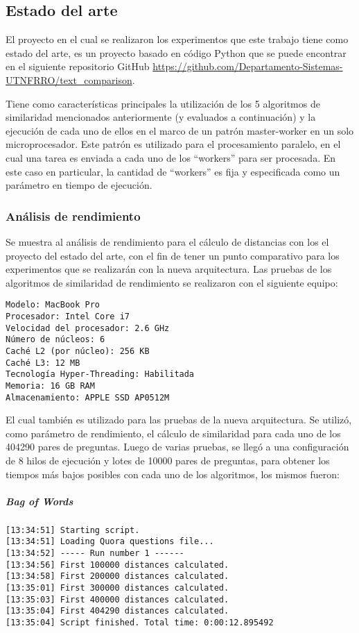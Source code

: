 \subsection{Estado del arte}
El proyecto en el cual se realizaron los experimentos que este trabajo tiene como estado del arte, es un proyecto basado en código Python que se puede encontrar en el siguiente repositorio GitHub \url{https://github.com/Departamento-Sistemas-UTNFRRO/text_comparison}.

\bigskip Tiene como características principales la utilización de los 5 algoritmos de similaridad mencionados anteriormente (y evaluados a continuación) y la ejecución de cada uno de ellos en el marco de un patrón master-worker en un solo microprocesador. Este patrón es utilizado para el procesamiento paralelo, en el cual una tarea es enviada a cada uno de los “workers” para ser procesada. En este caso en particular, la cantidad de “workers” es fija y especificada como un parámetro en tiempo de ejecución.

\subsubsection{Análisis de rendimiento}
Se muestra al análisis de rendimiento para el cálculo de distancias con los el proyecto del estado del arte, con el fin de tener un punto comparativo para los experimentos que se realizarán con la nueva arquitectura. Las pruebas de los algoritmos de similaridad de rendimiento se realizaron con el siguiente equipo:

\begin{verbatim}
Modelo: MacBook Pro
Procesador: Intel Core i7
Velocidad del procesador: 2.6 GHz
Número de núcleos: 6
Caché L2 (por núcleo): 256 KB
Caché L3: 12 MB
Tecnología Hyper-Threading: Habilitada
Memoria: 16 GB RAM
Almacenamiento: APPLE SSD AP0512M
\end{verbatim}

El cual también es utilizado para las pruebas de la nueva arquitectura. Se utilizó, como parámetro de rendimiento, el cálculo de similaridad para cada uno de los 404290 pares de preguntas. Luego de varias pruebas, se llegó a una configuración de 8 hilos de ejecución y lotes de 10000 pares de preguntas, para obtener los tiempos más bajos posibles con cada uno de los algoritmos, los mismos fueron:

\subparagraph{Bag of Words}
\begin{verbatim}
[13:34:51] Starting script.
[13:34:51] Loading Quora questions file...
[13:34:52] ----- Run number 1 ------
[13:34:56] First 100000 distances calculated.
[13:34:58] First 200000 distances calculated.
[13:35:01] First 300000 distances calculated.
[13:35:03] First 400000 distances calculated.
[13:35:04] First 404290 distances calculated.
[13:35:04] Script finished. Total time: 0:00:12.895492
\end{verbatim}

